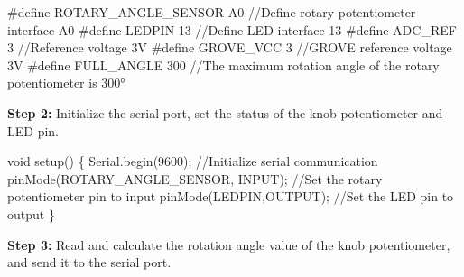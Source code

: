 \documentclass[
  letterpaper,
  DIV=11,
  numbers=noendperiod]{scrreprt}
\newenvironment{Shaded}{\begin{snugshade}}{\end{snugshade}}
\newcommand{\CommentTok}[1]{\textcolor[rgb]{0.37,0.37,0.37}{#1}}
\newcommand{\DataTypeTok}[1]{\textcolor[rgb]{0.68,0.00,0.00}{#1}}
\newcommand{\DecValTok}[1]{\textcolor[rgb]{0.68,0.00,0.00}{#1}}
\newcommand{\NormalTok}[1]{\textcolor[rgb]{0.00,0.23,0.31}{#1}}
\newcommand{\OperatorTok}[1]{\textcolor[rgb]{0.37,0.37,0.37}{#1}}
\newcommand{\PreprocessorTok}[1]{\textcolor[rgb]{0.68,0.00,0.00}{#1}}
\begin{document}
\begin{Shaded}
\begin{Highlighting}[]
\PreprocessorTok{\#define ROTARY\_ANGLE\_SENSOR }\NormalTok{A0}\PreprocessorTok{ }\CommentTok{//Define rotary potentiometer interface A0}
\PreprocessorTok{\#define LEDPIN }\DecValTok{13}\PreprocessorTok{ }\CommentTok{//Define LED interface 13}
\PreprocessorTok{\#define ADC\_REF }\DecValTok{3}\PreprocessorTok{ }\CommentTok{//Reference voltage 3V}
\PreprocessorTok{\#define GROVE\_VCC }\DecValTok{3}\PreprocessorTok{ }\CommentTok{//GROVE reference voltage 3V}
\PreprocessorTok{\#define FULL\_ANGLE }\DecValTok{300}\PreprocessorTok{ }\CommentTok{//The maximum rotation angle of the rotary potentiometer is 300°}
\end{Highlighting}
\end{Shaded}

\textbf{Step 2:} Initialize the serial port, set the status of the knob
potentiometer and LED pin.

\begin{Shaded}
\begin{Highlighting}[]
\DataTypeTok{void}\NormalTok{ setup}\OperatorTok{()}
\OperatorTok{\{}
\NormalTok{    Serial}\OperatorTok{.}\NormalTok{begin}\OperatorTok{(}\DecValTok{9600}\OperatorTok{);} \CommentTok{//Initialize serial communication}
\NormalTok{    pinMode}\OperatorTok{(}\NormalTok{ROTARY\_ANGLE\_SENSOR}\OperatorTok{,}\NormalTok{ INPUT}\OperatorTok{);} \CommentTok{//Set the rotary potentiometer pin to input}
\NormalTok{    pinMode}\OperatorTok{(}\NormalTok{LEDPIN}\OperatorTok{,}\NormalTok{OUTPUT}\OperatorTok{);} \CommentTok{//Set the LED pin to output }
\OperatorTok{\}}
\end{Highlighting}
\end{Shaded}

\textbf{Step 3:} Read and calculate the rotation angle value of the knob
potentiometer, and send it to the serial port.
\end{document}
